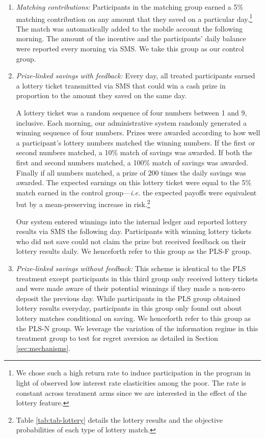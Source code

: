 \documentclass[12pt, titlepage]{article}
\begin{document}
		\begin{enumerate} \setlength{\itemsep}{1pt}

			\item \textit{Matching contributions:} Participants in the matching group earned a 5\% matching contribution on any amount that they saved on a particular day.\footnote{We chose such a high return rate to induce participation in the program in light of observed low interest rate elasticities among the poor. The rate is constant across treatment arms since we are interested in the effect of the lottery feature.} The match was automatically added to the mobile account the following morning. The amount of the incentive and the participants' daily balance were reported every morning via SMS. We take this group as our control group.

			\item \textit{Prize-linked savings with feedback:} Every day, all treated participants earned a lottery ticket transmitted via SMS that could win a cash prize in proportion to the amount they saved on the same day.

			A lottery ticket was a random sequence of four numbers between 1 and 9, inclusive. Each morning, our administrative system randomly generated a winning sequence of four numbers. Prizes were awarded according to how well a participant's lottery numbers matched the winning numbers. If the first or second numbers matched, a 10\% match of savings was awarded. If both the first and second numbers matched, a 100\% match of savings was awarded. Finally if all numbers matched, a prize of 200 times the daily savings was awarded. The expected earnings on this lottery ticket were equal to the 5\% match earned in the control group---\textit{i.e.} the expected payoffs were equivalent but by a mean-preserving increase in risk.\footnote{Table \ref{tab:tab-lottery} details the lottery results and the objective probabilities of each type of lottery match.}

			Our system entered winnings into the internal ledger and reported lottery results via SMS the following day. Participants with winning lottery tickets who did not save could not claim the prize but received feedback on their lottery results daily. We henceforth refer to this group as the PLS-F group. 

			\item \textit{Prize-linked savings without feedback:} This scheme is identical to the PLS treatment except participants in this third group only received lottery tickets and were made aware of their potential winnings if they made a non-zero deposit the previous day. While participants in the PLS group obtained lottery results everyday, participants in this group only found out about lottery matches conditional on saving. We henceforth refer to this group as the PLS-N group. We leverage the variation of the information regime in this treatment group to test for regret aversion as detailed in Section \ref{sec:mechanisms}.

		\end{enumerate}
\end{document}
